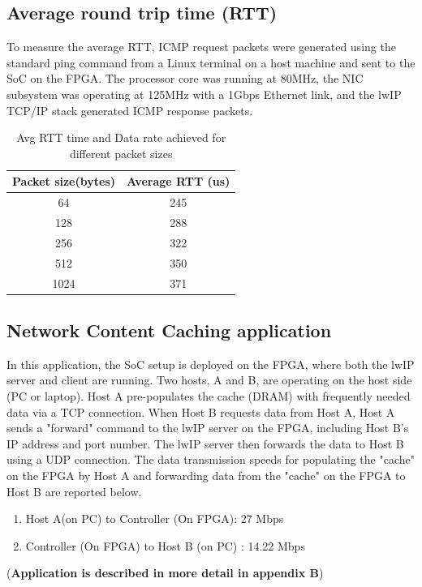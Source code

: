 \documentclass[12pt]{report}
\begin{document}
\subsection{Average round trip time (RTT)}
To measure the average RTT, ICMP request packets were generated using the standard ping command from a Linux terminal on a host machine and sent to the SoC on the FPGA. The processor core was running at 80MHz, the NIC subsystem was operating at 125MHz with a 1Gbps Ethernet link, and the lwIP TCP/IP stack generated ICMP response packets.

\begin{table}[h!]
\caption{Avg RTT time and Data rate achieved for different  packet sizes}
\begin{center}
\begin{tabular}{|c|c|}

\hline
\textbf{Packet size(bytes)} & \textbf{Average RTT (us)}  \\
\hline
64 & 245    \\
\hline
128 & 288   \\
\hline
256 & 322   \\
\hline
512 & 350   \\
\hline
1024 & 371   \\
\hline
\end{tabular}
\label{table_dataRate2}
\end{center}
\end{table}



\newpage
\subsection{Network Content Caching application}
In this application, the SoC setup is deployed on the FPGA, where both the lwIP server and client are running. Two hosts, A and B, are operating on the host side (PC or laptop). Host A pre-populates the cache (DRAM) with frequently needed data via a TCP connection. When Host B requests data from Host A, Host A sends a "forward" command to the lwIP server on the FPGA, including Host B's IP address and port number. The lwIP server then forwards the data to Host B using a UDP connection. The data transmission speeds for populating the "cache" on the FPGA by Host A and forwarding data from the "cache" on the FPGA to Host B are reported below.
\begin{enumerate}
    \item Host A(on PC) to Controller (On FPGA): 27 Mbps
    \item Controller (On FPGA) to Host B (on PC) : 14.22 Mbps
\end{enumerate}
(\textbf{Application is described in more detail in appendix B})
\end{document}
